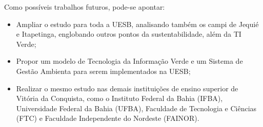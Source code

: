 Como possíveis trabalhos futuros, pode-se apontar:

\begin{itemize}
\item Ampliar o estudo para toda a UESB, analisando também os campi de Jequié e Itapetinga, englobando outros pontos da sustentabilidade, além da TI Verde;
\item Propor um modelo de Tecnologia da Informação Verde e  um Sistema de Gestão Ambienta para serem implementados na UESB;
\item Realizar o mesmo estudo nas demais instituições de ensino superior de Vitória da Conquista, como o Instituto Federal da Bahia (IFBA), Universidade Federal da Bahia (UFBA), Faculdade de Tecnologia e Ciências (FTC) e Faculdade Independente do Nordeste (FAINOR).
\end{itemize}


